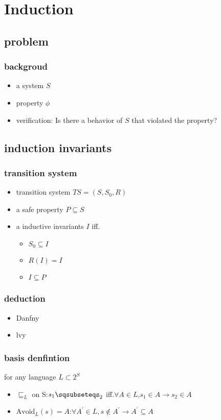 \section{Induction}
\subsection{problem}
\begin{frame}
    \frametitle{backgroud}
    \begin{itemize}
        \item a system $S$
        \item property $\phi$
        \item verification: Is there a behavior of $S$ that violated the property?
    \end{itemize}
\end{frame}

\subsection{induction invariants}
\begin{frame}
    \frametitle{transition system}
    \begin{itemize}
        \item transition system $TS=(S,S_{0},R)$
        \item a safe property $P\subseteq S$
        \item a inductive invariants $I$ iff.
        \begin{itemize}
            \item $S_{0}\subseteq I$
            \item $R(I)=I$
            \item $I\subseteq P$
        \end{itemize}
    \end{itemize}
\end{frame}
\begin{frame}
    \frametitle{deduction}
    \begin{itemize}
        \item Danfny
        \item lvy
    \end{itemize}
\end{frame}

\begin{frame}
    \frametitle{basis denfintion}
    for any language $L\subset 2^{S}$
    \begin{itemize}
        \item $\sqsubseteq_{L}$ on S:$s_{1}\sqsubseteqs_{2}$ iff.$\forall A\in L$,$s_{1}\in A\rightarrow s_{2}\in A$
        \item $\text{Avoid}_{L}(s)=A$:$\forall A^{\prime}\in L, s\notin A^{\prime}\rightarrow A^{\prime}\subseteq A$
    \end{itemize}
\end{frame}